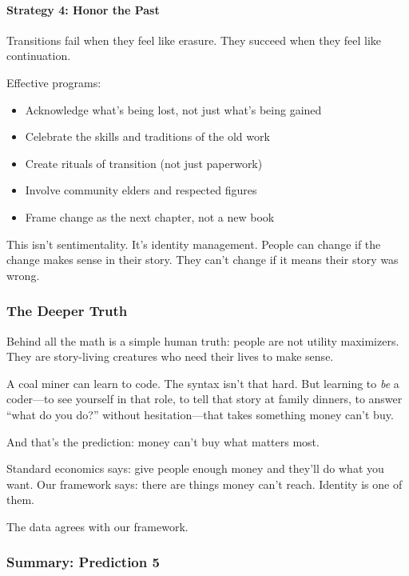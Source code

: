\paragraph{Strategy 4: Honor the Past}

Transitions fail when they feel like erasure. They succeed when they 
feel like continuation.

Effective programs:
\begin{itemize}
    \item Acknowledge what's being lost, not just what's being gained
    \item Celebrate the skills and traditions of the old work
    \item Create rituals of transition (not just paperwork)
    \item Involve community elders and respected figures
    \item Frame change as the next chapter, not a new book
\end{itemize}

This isn't sentimentality. It's identity management. People can change 
if the change makes sense in their story. They can't change if it means 
their story was wrong.

\subsubsection{The Deeper Truth}

Behind all the math is a simple human truth: people are not utility 
maximizers. They are story-living creatures who need their lives to 
make sense.

A coal miner can learn to code. The syntax isn't that hard. But learning 
to \emph{be} a coder---to see yourself in that role, to tell that story 
at family dinners, to answer ``what do you do?'' without hesitation---that 
takes something money can't buy.

And that's the prediction: money can't buy what matters most.

Standard economics says: give people enough money and they'll do what 
you want. Our framework says: there are things money can't reach. 
Identity is one of them.

The data agrees with our framework.

\subsubsection{Summary: Prediction 5}

